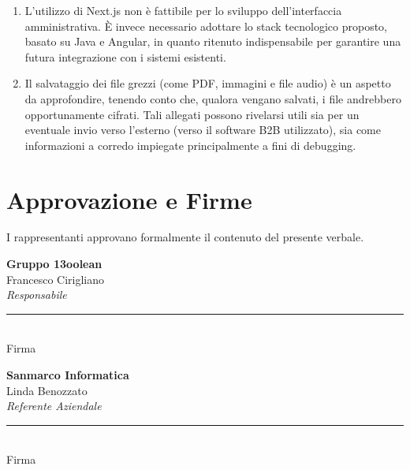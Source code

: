 \documentclass[11pt, a4paper]{article}
\newcommand{\bloccofirma}[3]{%
	\begin{minipage}[t]{0.42\textwidth}
		\textbf{#1}\\[0.3em]   %
		#2\\                   %
		\textit{#3}\\[3em]     %
		\rule{\linewidth}{0.4pt}\\
		{\small Firma}
	\end{minipage}%
}
\begin{document}
\begin{enumerate}
	\item L'utilizzo di Next.js non è fattibile per lo sviluppo dell'interfaccia amministrativa. È invece necessario adottare lo stack tecnologico proposto, basato su Java e Angular, in quanto ritenuto indispensabile per garantire una futura integrazione con i sistemi esistenti.
	\item Il salvataggio dei file grezzi (come PDF, immagini e file audio) è un aspetto da approfondire, tenendo conto che, qualora vengano salvati, i file andrebbero opportunamente cifrati. Tali allegati possono rivelarsi utili sia per un eventuale invio verso l'esterno (verso il software B2B utilizzato), sia come informazioni a corredo impiegate principalmente a fini di debugging.
\end{enumerate}
\section{Approvazione e Firme}
I rappresentanti approvano formalmente il contenuto del presente verbale.
\vspace{2em}
\newline
\vspace{2em}
\noindent
\bloccofirma{Gruppo 13oolean}{Francesco Cirigliano}{Responsabile}%
\hfill
\bloccofirma{Sanmarco Informatica}{Linda Benozzato}{Referente Aziendale}
\end{document}
